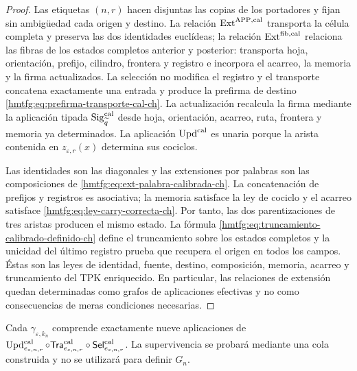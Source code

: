 \begin{proof}
Las etiquetas \((n,r)\) hacen disjuntas las copias de los portadores y fijan
sin ambigüedad cada origen y destino. La relación
\(\operatorname{Ext}^{\mathrm{APP},\rm cal}\) transporta la célula completa y
preserva las dos identidades euclídeas; la relación
\(\operatorname{Ext}^{\rm fib,cal}\) relaciona las fibras de los estados
completos anterior y posterior: transporta hoja, orientación, prefijo,
cilindro, frontera y registro e incorpora el acarreo, la memoria y la firma
actualizados. La selección no modifica el registro y el transporte concatena
exactamente una entrada y produce la prefirma de destino
\eqref{hmtfg:eq:prefirma-transporte-cal-ch}. La actualización recalcula la firma mediante la
aplicación tipada \(\operatorname{Sig}^{\rm cal}_{\widetilde q}\) desde
hoja, orientación, acarreo, ruta, frontera y memoria ya determinados. La aplicación
\(\operatorname{Upd}^{\rm cal}\) es unaria porque la arista contenida en
\(z_{\varepsilon,r}(x)\) determina sus cociclos.

Las identidades son las diagonales y las extensiones por palabras son las
composiciones de \eqref{hmtfg:eq:ext-palabra-calibrada-ch}. La concatenación de
prefijos y registros es asociativa; la memoria satisface la ley de cociclo y
el acarreo satisface
\eqref{hmtfg:eq:ley-carry-correcta-ch}. Por tanto, las dos parentizaciones de tres
aristas producen el mismo estado. La fórmula
\eqref{hmtfg:eq:truncamiento-calibrado-definido-ch} define el truncamiento sobre
los estados completos y la unicidad del último registro prueba que recupera
el origen en todos los campos. Éstas son las leyes de identidad, fuente,
destino, composición, memoria, acarreo y truncamiento del TPK enriquecido.
En particular, las relaciones de extensión quedan determinadas como grafos
de aplicaciones efectivas y no como consecuencias de meras condiciones
necesarias.
\end{proof}

Cada \(\gamma_{\varepsilon,k_n}\) comprende exactamente nueve aplicaciones
de \(\operatorname{Upd}^{\rm cal}_{e_{\varepsilon,n,r}}\circ
\mathsf{Tra}^{\rm cal}_{e_{\varepsilon,n,r}}\circ
\mathsf{Sel}^{\rm cal}_{e_{\varepsilon,n,r}}\). La
supervivencia se probará mediante una cola construida y no se utilizará para
definir \(G_n\).

